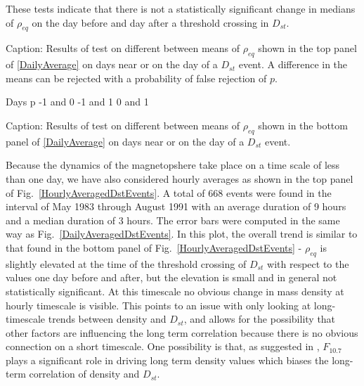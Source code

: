 \documentclass[10pt,twocolumn]{article}
\begin{document}
These tests indicate that there is not a statistically significant change in medians of $\rho_{eq}$ on the day before and day after a threshold crossing in $D_{st}$.  



Caption: Results of test on different between means of $\rho_{eq}$ shown in the top panel of \ref{DailyAverage} on days near or on the day of a $D_{st}$ event.  A difference in the means can be rejected with a probability of false rejection of $p$.

   Days     p
-1 and 0
-1 and 1
 0 and 1

Caption: Results of test on different between means of $\rho_{eq}$ shown in the bottom panel of \ref{DailyAverage} on days near or on the day of a $D_{st}$ event.  

Because the dynamics of the magnetopshere take place on a time scale of less than one day, we have also considered hourly averages as shown in the top panel of Fig.~\ref{HourlyAveragedDstEvents}.  A total of 668 events were found in the interval of May 1983 through August 1991 with an average duration of 9 hours and a median duration of 3 hours.  The error bars were computed in the same way as Fig.~\ref{DailyAveragedDstEvents}.  In this plot, the overall trend is similar to that found in the bottom panel of Fig.~\ref{HourlyAveragedDstEvents} - $\rho_{eq}$ is slightly elevated at the time of the threshold crossing of $D_{st}$ with respect to the values one day before and after, but the elevation is small and in general not statistically significant.  At this timescale no obvious change in mass density at hourly timescale is visible. This points to an issue with only looking at long-timescale trends between density and $D_{st}$, and allows for the possibility that other factors are influencing the long term correlation because there is no obvious connection on a short timescale.  One possibility is that, as suggested in \cite{Takahashi2010}, $F_{10.7}$ plays a significant role in driving long term density values which biases the long-term correlation of density and $D_{st}$.
\end{document}
